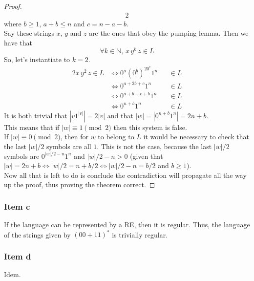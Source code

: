 \documentclass[docid=TP07]{tcom_TP}
\begin{document}
{\begin{proof}
\begin{alignat*}{2}
\end{alignat*}
where $b \geq 1$, $a+b \leq n$ and $c=n-a-b$.\\
Say these strings $x$, $y$ and $z$ are the ones that obey the pumping lemma. Then we have that
\begin{equation*}
	\forall k \in \mathbb{N},\,x\,y^k\,z \in L
\end{equation*}
So, let's instantiate to $k=2$.
\begin{alignat*}{2}
	x\,y^2\,z \in L
	& \iff 0^a(0^b)^20^c1^n &&\in L \\
	& \iff 0^{a+2b+c}1^n    &&\in L \\
	& \iff 0^{a+b+c+b}1^n   &&\in L \\
	& \iff 0^{n+b}1^n       &&\in L
\end{alignat*}
It is both trivial that $|v 1^{|v|} | = 2|v|$ and that $|w|=|0^{n+b}1^n|=2n+b$.\\
This means that if $|w| \equiv 1 \pmod{2}$ then this system is false.\\
If $|w| \equiv 0 \pmod{2}$, then for $w$ to belong to $L$ it would be necessary to check that the last $|w|/2$ symbols are all $1$. This is not the case, because the last $|w|/2$ symbols are $0^{|w|/2-n}1^n$ and $|w|/2-n > 0$ (given that $|w|=2n+b \iff |w|/2=n+b/2 \iff |w|/2-n=b/2$ and $b \geq 1$).\\
Now all that is left to do is conclude the contradiction will propagate all the way up the proof, thus proving the theorem correct.
\end{proof}
\subsubsection{Item c}
If the language can be represented by a RE, then it is regular. Thus, the language of the strings given by $(00+11)^*$ is trivially regular.
\subsubsection{Item d}
Idem.
}
\end{document}
